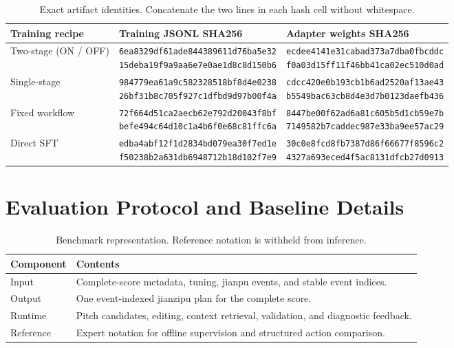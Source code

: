 \begin{table}[t]
\centering\scriptsize
\setlength{\tabcolsep}{5pt}
\begin{tabularx}{\textwidth}{@{}Xll@{}}
\toprule
Training recipe & Training JSONL SHA256 & Adapter weights SHA256 \\
\midrule
Two-stage (ON / OFF) & \shortstack[l]{\texttt{6ea8329df61ade844389611d76ba5e32}\\\texttt{15deba19f9a9aa6e7e0ae1d8c8d150b6}} & \shortstack[l]{\texttt{ecdee4141e31cabad373a7dba0fbcddc}\\\texttt{f0a03d15ff11f46bb41ca02ec510d0ad}} \\
Single-stage & \shortstack[l]{\texttt{984779ea61a9c582328518bf8d4e0238}\\\texttt{26bf31b8c705f927c1dfbd9d97b00f4a}} & \shortstack[l]{\texttt{cdcc420e0b193cb1b6ad2520af13ae43}\\\texttt{b5549bac63cb8d4e3d7b0123daefb436}} \\
Fixed workflow & \shortstack[l]{\texttt{72f664d51ca2aecb62e792d20043f8bf}\\\texttt{befe494c64d10c1a4b6f0e68c81ffc6a}} & \shortstack[l]{\texttt{8447be00f62ad6a81c605b5d1cb59e7b}\\\texttt{7149582b7caddec987e33ba9ee57ac29}} \\
Direct SFT & \shortstack[l]{\texttt{edba4abf12f1d2834bd079ea30f7ed1e}\\\texttt{f50238b2a631db6948712b18d102f7e9}} & \shortstack[l]{\texttt{30c0e8fcd8fb7387d86f66677f8596c2}\\\texttt{4327a693eced4f5ac8131dfcb27d0913}} \\
\bottomrule
\end{tabularx}
\caption{Exact artifact identities. Concatenate the two lines in each hash cell without whitespace.}
\label{tab:training-fingerprints}
\end{table}

\section{Evaluation Protocol and Baseline Details}
\label{sec:evaluation-details}

\begin{table}[t]
\centering\small
\begin{tabularx}{\linewidth}{@{}lX@{}}
\toprule
Component & Contents \\
\midrule
Input & Complete-score metadata, tuning, jianpu events, and stable event indices. \\
Output & One event-indexed jianzipu plan for the complete score. \\
Runtime & Pitch candidates, editing, context retrieval, validation, and diagnostic feedback. \\
Reference & Expert notation for offline supervision and structured action comparison. \\
\bottomrule
\end{tabularx}
\caption{Benchmark representation. Reference notation is withheld from inference.}
\label{tab:benchmark}
\end{table}

